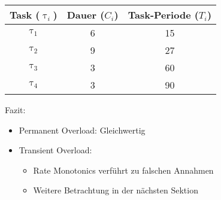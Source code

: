 \begin{frame}{\subsubsecname}
	\begin{center}
		\begin{tabular}{c||c|c}
			Task ($\uptau_i$) & Dauer ($C_i$) & Task-Periode ($T_i$)\\\hline\hline
			$\uptau_1$ & 6 & 15\\
			$\uptau_2$ & 9 & 27\\
			$\uptau_3$ & 3 & 60\\
			$\uptau_4$ & 3 & 90
		\end{tabular}
	\end{center}
	
\end{frame}

\begin{frame}{\subsecname}
	Fazit:
	\begin{itemize}
		\item Permanent Overload: Gleichwertig
		\item Transient Overload:
		\begin{itemize}
			\item Rate Monotonics verführt zu falschen Annahmen
			\item Weitere Betrachtung in der nächsten Sektion
		\end{itemize}
	\end{itemize}
\end{frame}